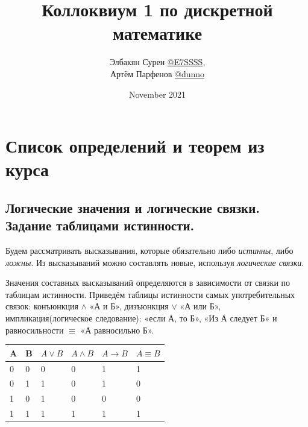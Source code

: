 \documentclass[a4paper, 10pt]{article}
\title{Коллоквиум 1 по дискретной математике}
\author{Элбакян Сурен  \href{https://t.me/E7SSSS}{@E7SSSS}, \\ Артём Парфенов \href{https://t.me/dunno_0}{@dunno}}
\date{November 2021}
\begin{document}
\maketitle

\tableofcontents

\newpage

\section{Список определений и теорем из курса}

\subsection{Логические значения и логические связки. Задание таблицами истинности.}


Будем рассматривать высказывания, которые обязательно либо \textit{истинны}, либо \textit{ложны}. Из высказываний можно составлять новые, используя \textit{логические связки}.

Значения составных высказываний определяются в зависимости от связки по таблицам истинности. Приведём таблицы истинности самых употребительных связок: конъюнкция $\wedge$ «А и Б», дизъюнкция $\vee$ «А или Б», импликация(логическое следование): «если А, то Б», «Из А следует Б» и равносильности $\equiv$ «А равносильно Б».

\begin{center}
	\begin{table}[h]
		\centering
		\begin{tabular}{|l|l|l|l|l|l|}
			\hline
			\multicolumn{1}{|c|}{A} & B & $A \vee B$ & $A \wedge B$ & $A \to B$ & $A \equiv B $\\ \hline
			0                       & 0 & 0                       & 0                         & 1                      & 1                         \\ \hline
			0                       & 1 & 1                       & 0                         & 1                      & 0                         \\ \hline
			1                       & 0 & 1                       & 0                         & 0                      & 0                         \\ \hline
			1                       & 1 & 1                       & 1                         & 1                      & 1                         \\ \hline
		\end{tabular}
	\end{table}
\end{center}
\end{document}
